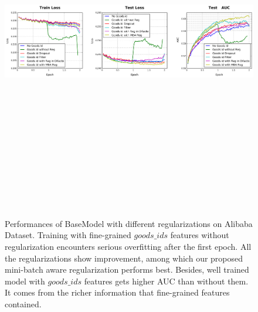 \begin{figure}[!t]
\centering
\includegraphics[height=6.2in, width=6.2in, keepaspectratio]{images/exp/reg_new.png}
\caption{Performances of BaseModel with different regularizations on Alibaba Dataset. Training with fine-grained $goods\_ids$ features without regularization encounters serious overfitting after the first epoch. All the regularizations show improvement, among which our proposed mini-batch aware regularization performs best. Besides, well trained model with $goods\_ids$ features gets higher AUC than without them. It comes from the richer information that fine-grained features contained.}
\label{fig:adaptive_reg}
\end{figure}






